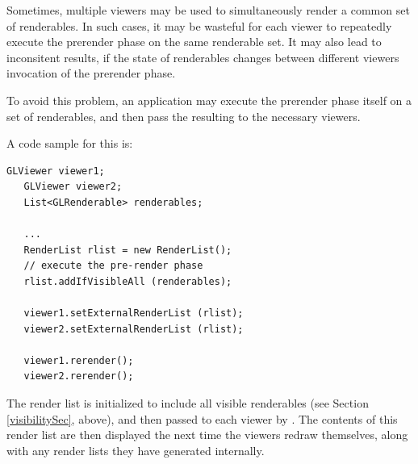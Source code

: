 \documentclass{article}
\begin{document}
Sometimes, multiple viewers may be used to simultaneously render a
common set of renderables. In such cases, it may be wasteful for each
viewer to repeatedly execute the prerender phase on the same
renderable set. It may also lead to inconsitent results, if the state
of renderables changes between different viewers invocation of the
prerender phase.

To avoid this problem, an application may execute the prerender
phase itself on a set of renderables, and then pass the
resulting  to the necessary viewers.

A code sample for this is:
\begin{lstlisting}[]
   GLViewer viewer1;
   GLViewer viewer2;
   List<GLRenderable> renderables;

   ...
   RenderList rlist = new RenderList();
   // execute the pre-render phase
   rlist.addIfVisibleAll (renderables);

   viewer1.setExternalRenderList (rlist);
   viewer2.setExternalRenderList (rlist);

   viewer1.rerender();
   viewer2.rerender();
\end{lstlisting}

The render list is initialized to include all visible renderables (see
Section \ref{visibilitySec}, above), and then passed to each viewer 
by . The contents
of this render list are then displayed the next time the viewers
redraw themselves, along with any render lists they have generated
internally.
\end{document}
